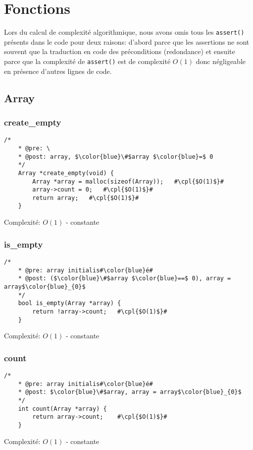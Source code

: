 \documentclass[a4paper, 11pt, oneside]{article}
\begin{document}
	\clearpage
\section {Fonctions}
	Lors du calcul de complexité algorithmique, nous avons omis tous les \texttt{assert()} présents dans le code pour deux raisons: d'abord parce que les assertions ne sont souvent que la traduction en code des préconditions (redondance) et ensuite parce que la complexité de \texttt{assert()} est de complexité $O(1)$ donc négligeable en présence d'autres lignes de code.
	\subsection{Array}
	\subsubsection{create\_empty}
	\begin{lstlisting}[mathescape]
	/*
	* @pre: \
	* @post: array, $\color{blue}\#$array $\color{blue}=$ 0
	*/
	Array *create_empty(void) {
		Array *array = malloc(sizeof(Array));	#\cpl{$O(1)$}#
		array->count = 0;	#\cpl{$O(1)$}#
		return array;	#\cpl{$O(1)$}#
	}
	\end{lstlisting}
	Complexité: $O(1)$ - constante
	
	\subsubsection{is\_empty}
	\begin{lstlisting}[mathescape]
	/*
	* @pre: array initialis#\color{blue}é#
	* @post: ($\color{blue}\#$array $\color{blue}==$ 0), array = array$\color{blue}_{0}$
	*/
	bool is_empty(Array *array) {
		return !array->count;	#\cpl{$O(1)$}#
	}
	\end{lstlisting}
	Complexité: $O(1)$ - constante
	
	\subsubsection{count}
	\begin{lstlisting}[mathescape]
	/*
	* @pre: array initialis#\color{blue}é#
	* @post: $\color{blue}\#$array, array = array$\color{blue}_{0}$
	*/
	int count(Array *array) {
		return array->count;	#\cpl{$O(1)$}#
	}
	\end{lstlisting}
	Complexité: $O(1)$ - constante
	
	\clearpage
\end{document}

